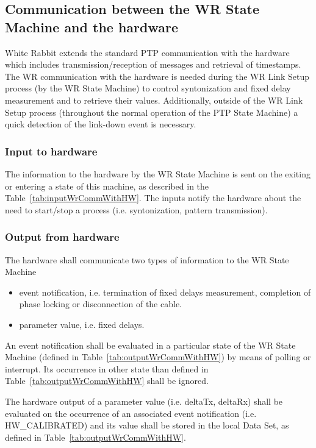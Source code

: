 \documentclass[a4paper, 12pt]{article}
\begin{document}
\newpage

\subsection{Communication between the WR State Machine and the hardware}
\label{sec:communicationWithHW}

White Rabbit extends the standard PTP communication with the hardware which includes 
transmission/reception of messages and retrieval of timestamps.
The WR communication with the hardware is needed during the WR Link Setup process 
(by the WR State Machine) to control syntonization and fixed delay measurement and to retrieve 
their values. Additionally, outside of the WR Link Setup process (throughout the normal operation 
of the PTP State Machine) a quick detection of the link-down event is necessary. 

\subsubsection{Input to hardware}
\label{sec:inputHW}

The information to the hardware by the WR State Machine is sent on the exiting or entering 
a state of this machine, as described in the Table~\ref{tab:inputWrCommWithHW}. The inputs notify 
the hardware about the need to start/stop a process (i.e. syntonization, pattern transmission).

\subsubsection{Output from hardware}
\label{sec:hwOutput}

The hardware shall communicate two types of information to the WR State Machine
\begin{itemize}
\item event notification, i.e. termination of fixed delays measurement, completion of phase locking or
      disconnection of the cable. 
\item parameter value, i.e. fixed delays. 
\end{itemize}

An event notification shall be evaluated in a particular state of the WR State Machine (defined in 
Table~\ref{tab:outputWrCommWithHW}) by means of polling or interrupt. Its occurrence in other 
state than defined in Table~\ref{tab:outputWrCommWithHW} shall be ignored.

The hardware output of a parameter value (i.e. deltaTx, deltaRx) shall be evaluated on the 
occurrence of an associated event notification (i.e. HW\_CALIBRATED) 
and its value shall be stored in the local Data Set, as defined in Table~\ref{tab:outputWrCommWithHW}.
\end{document}
